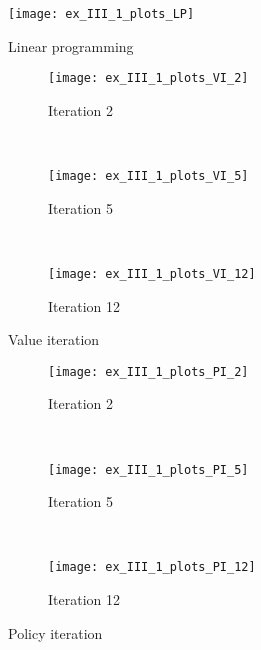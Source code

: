 \begin{multicols}{3}
\newlength{\figsize}
\setlength{\figsize}{.25\textwidth}
\begin{figure}[H]
	\centering
	\texttt{[image: ex\_III\_1\_plots\_LP]}
	\caption{Linear programming}
	\label{fig:LP}
\end{figure}
\columnbreak
\begin{figure}[H]
	\centering
	\begin{subfigure}{\figsize}
		\centering
		\texttt{[image: ex\_III\_1\_plots\_VI\_2]}
		\caption{Iteration 2}
		\label{fig:ex_III_1_plots_VI_2}
	\end{subfigure}\\
	\begin{subfigure}{\figsize}
		\centering
		\texttt{[image: ex\_III\_1\_plots\_VI\_5]}
		\caption{Iteration 5}
		\label{fig:ex_III_1_plots_VI_5}
	\end{subfigure}\\
	\begin{subfigure}{\figsize}
		\centering
		\texttt{[image: ex\_III\_1\_plots\_VI\_12]}
		\caption{Iteration 12}
		\label{fig:ex_III_1_plots_VI_12}
	\end{subfigure}
	\caption{Value iteration}
	\label{fig:VI}
\end{figure}
\begin{figure}[H]
	\centering
	\begin{subfigure}{\figsize}
		\centering
		\texttt{[image: ex\_III\_1\_plots\_PI\_2]}
		\caption{Iteration 2}
		\label{fig:ex_III_1_plots_PI_2}
	\end{subfigure}\\
	\begin{subfigure}{\figsize}
		\centering
		\texttt{[image: ex\_III\_1\_plots\_PI\_5]}
		\caption{Iteration 5}
		\label{fig:ex_III_1_plots_PI_5}
	\end{subfigure}\\
	\begin{subfigure}{\figsize}
		\centering
		\texttt{[image: ex\_III\_1\_plots\_PI\_12]}
		\caption{Iteration 12}
		\label{fig:ex_III_1_plots_PI_12}
	\end{subfigure}
	\caption{Policy iteration}
	\label{fig:PI}
\end{figure}
\end{multicols}

